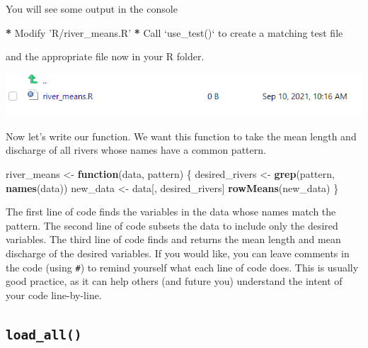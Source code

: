 \documentclass[
]{book}
\newenvironment{Shaded}{\begin{snugshade}}{\end{snugshade}}
\newcommand{\ControlFlowTok}[1]{\textcolor[rgb]{0.13,0.29,0.53}{\textbf{#1}}}
\newcommand{\DataTypeTok}[1]{\textcolor[rgb]{0.13,0.29,0.53}{#1}}
\newcommand{\KeywordTok}[1]{\textcolor[rgb]{0.13,0.29,0.53}{\textbf{#1}}}
\newcommand{\NormalTok}[1]{#1}
\newcommand{\OperatorTok}[1]{\textcolor[rgb]{0.81,0.36,0.00}{\textbf{#1}}}
\newcommand{\StringTok}[1]{\textcolor[rgb]{0.31,0.60,0.02}{#1}}
\begin{document}
You will see some output in the console

\begin{Shaded}
\begin{Highlighting}[]
\OperatorTok{*}\StringTok{ }\NormalTok{Modify }\StringTok{'R/river_means.R'}
\OperatorTok{*}\StringTok{ }\NormalTok{Call }\StringTok{`}\DataTypeTok{use_test()}\StringTok{`}\NormalTok{ to create a matching test file }
\end{Highlighting}
\end{Shaded}

and the appropriate file now in your R folder.

\includegraphics[width=1\linewidth]{images/newrpack_function}

Now let's write our function. We want this function to take the mean length and discharge of all rivers whose names have a common pattern.

\begin{Shaded}
\begin{Highlighting}[]
\NormalTok{river_means <-}\StringTok{ }\ControlFlowTok{function}\NormalTok{(data, pattern) \{}
\NormalTok{  desired_rivers <-}\StringTok{ }\KeywordTok{grep}\NormalTok{(pattern, }\KeywordTok{names}\NormalTok{(data))}
\NormalTok{  new_data <-}\StringTok{ }\NormalTok{data[, desired_rivers]}
  \KeywordTok{rowMeans}\NormalTok{(new_data)}
\NormalTok{\}}
\end{Highlighting}
\end{Shaded}

The first line of code finds the variables in the data whose names match the pattern. The second line of code subsets the data to include only the desired variables. The third line of code finds and returns the mean length and mean discharge of the desired variables. If you would like, you can leave comments in the code (using \texttt{\#}) to remind yourself what each line of code does. This is usually good practice, as it can help others (and future you) understand the intent of your code line-by-line.

\hypertarget{load_all}{%
\subsection{\texorpdfstring{\texttt{load\_all()}}{load\_all()}}\label{load_all}}
\end{document}
